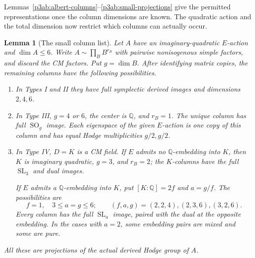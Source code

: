 \documentclass[11pt]{article}
\newcommand{\Q}{\mathbb Q}
\newtheorem{lemma}[theorem]{Lemma}
\numberwithin{equation}{section}
\begin{document}
Lemmas~\ref{p3ab:albert-columns}--\ref{p3ab:small-projections} give the
permitted representations once the column dimensions are known.  The
quadratic action and the total dimension now restrict which columns can
actually occur.

\begin{lemma}[The small column list]
\label{p3ab:small-columns}
Let \(A\) have an imaginary-quadratic \(E\)-action and
\(\dim A\leq6\).  Write \(A\sim\prod_B B^{r_B}\) with pairwise
nonisogenous simple factors, and discard the CM factors.  Put
\(g=\dim B\).  After identifying matrix copies, the remaining
columns have the following possibilities.
\begin{enumerate}
\item In Types I and II they have full symplectic derived images
and dimensions \(2,4,6\).
\item In Type III, \(g=4\) or \(6\), the center is \(\Q\), and
\(r_B=1\).  The unique column has full
\(\operatorname{SO}_g\) image.  Each eigenspace of the given
\(E\)-action is one copy of this column and has equal Hodge
multiplicities \(g/2,g/2\).
\item In Type IV, \(D=K\) is a CM field.  If \(E\) admits no
\(\Q\)-embedding into \(K\), then \(K\) is imaginary quadratic,
\(g=3\), and \(r_B=2\); the \(K\)-columns have the full
\(\operatorname{SL}_3\) and dual images.

If \(E\) admits a \(\Q\)-embedding into \(K\), put
\([K:\Q]=2f\) and \(a=g/f\).  The possibilities are
\[
 f=1,\quad 3\leq a=g\leq6;
 \qquad (f,a,g)=(2,2,4),(2,3,6),(3,2,6).
\]
Every column has the full \(\operatorname{SL}_a\) image,
paired with the dual at the opposite embedding.  In the cases
with \(a=2\), some embedding pairs are mixed and some are pure.
\end{enumerate}
All these are projections of the actual derived Hodge group of \(A\).
\end{lemma}
\end{document}
